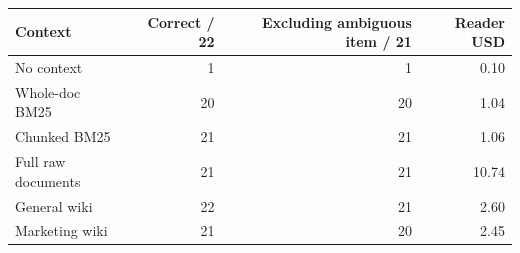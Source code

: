 \begin{tabular}{lrrr}
\toprule
Context & Correct / 22 & Excluding ambiguous item / 21 & Reader USD \\
\midrule
No context & 1 & 1 & 0.10 \\
Whole-doc BM25 & 20 & 20 & 1.04 \\
Chunked BM25 & 21 & 21 & 1.06 \\
Full raw documents & 21 & 21 & 10.74 \\
General wiki & 22 & 21 & 2.60 \\
Marketing wiki & 21 & 20 & 2.45 \\
\bottomrule
\end{tabular}

